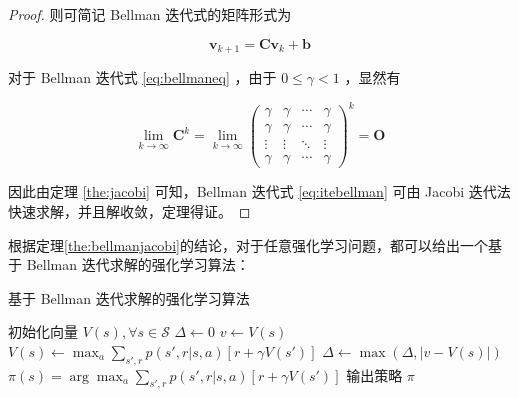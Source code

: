 \begin{proof}
则可简记 Bellman 迭代式的矩阵形式为

\begin{equation}\label{eq:bellmaneq}
    \boldsymbol{v}_{k+1} =\boldsymbol{Cv}_k+\boldsymbol{b}
\end{equation}

对于 Bellman 迭代式 \ref{eq:bellmaneq} ，由于 $0\leq\gamma<1$ ，显然有

\begin{equation}
    \lim_{k\rightarrow \infty} \boldsymbol{C}^k = \lim_{k\rightarrow \infty}\left(\begin{array}{cccc}
    \gamma & \gamma & \cdots & \gamma \\
    \gamma & \gamma & \cdots & \gamma \\
    \vdots & \vdots & \ddots & \vdots \\
    \gamma & \gamma & \cdots & \gamma
    \end{array}\right)^k = \boldsymbol{O}
\end{equation}

因此由定理 \ref{the:jacobi} 可知，Bellman 迭代式 \ref{eq:itebellman} 可由 Jacobi 迭代法快速求解，并且解收敛，定理得证。

\end{proof}

根据定理\ref{the:bellmanjacobi}的结论，对于任意强化学习问题，都可以给出一个基于 Bellman 迭代求解的强化学习算法：

\begin{algorithm}[H]
    \caption{基于 Bellman 迭代求解的强化学习算法}
    \begin{algorithmic}[1] %
        \State 初始化向量 $V(s), \forall s\in \mathcal S$
        \Repeat
        \State $\Delta\leftarrow 0$
        \State $v\leftarrow V(s)$
        \State $V(s)\leftarrow \max_a\sum_{s',r}p(s',r|s,a)[r+\gamma V(s')]$
        \State $\Delta \leftarrow \max(\Delta,|v-V(s)|)$
        \EndFor
        \Until{ $\Delta<\theta$}
        \State
        \State $\pi(s)=\arg\max_a\sum_{s',r}p(s',r|s,a)[r+\gamma V(s')]$
        \State 输出策略 $\pi$
    \end{algorithmic}
\end{algorithm}